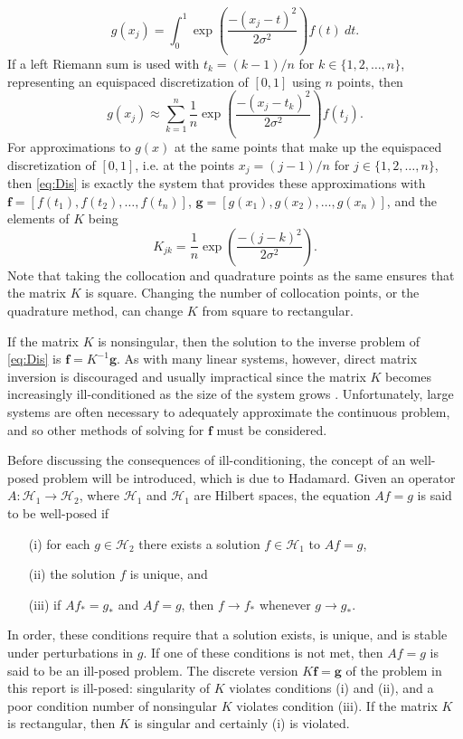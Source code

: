 \documentclass[12pt,notitlepage]{report}
\newcommand{\gVec}{\mathbf{g}}	%
\newcommand{\kMat}{K}	%
\newcommand{\fVec}{\mathbf{f}}	%
\newcommand{\noiseSD}{\sigma}	%
\begin{document}
\[g(x_j) = \int_0^1 \exp\left(\frac{-(x_j - t)^2}{2\noiseSD^2}\right)f(t) \: dt.\]
If a left Riemann sum is used with $t_k = (k-1)/n$ for $k \in \{1,2,\ldots,n\}$, representing an equispaced discretization of $[0,1]$ using $n$ points, then
\[g(x_j) \approx \sum_{k=1}^n \frac{1}{n}\exp\left(\frac{-(x_j - t_k)^2}{2\noiseSD^2}\right)f(t_j).\]
For approximations to $g(x)$ at the same points that make up the equispaced discretization of $[0,1]$, i.e. at the points $x_j = (j-1)/n$ for $j \in \{1,2,\ldots,n\}$, then \eqref{eq:Dis} is exactly the system that provides these approximations with $\fVec = [f(t_1),f(t_2),\ldots,f(t_n)]$, $\gVec = [g(x_1),g(x_2),\ldots,g(x_n)]$, and the elements of $\kMat$ being
\[K_{jk} = \frac{1}{n}\exp\left(\frac{-(j - k)^2}{2\noiseSD^2}\right).\]
Note that taking the collocation and quadrature points as the same ensures that the matrix $\kMat$ is square. Changing the number of collocation points, or the quadrature method, can change $\kMat$ from square to rectangular. \par
If the matrix $\kMat$ is nonsingular, then the solution to the inverse problem of \eqref{eq:Dis} is $\fVec = \kMat^{-1}\gVec$. As with many linear systems, however, direct matrix inversion is discouraged and usually impractical since the matrix $\kMat$ becomes increasingly ill-conditioned as the size of the system grows \cite{Vogel:2002}. Unfortunately, large systems are often necessary to adequately approximate the continuous problem, and so other methods of solving for $\fVec$ must be considered. \par
Before discussing the consequences of ill-conditioning, the concept of an well-posed problem will be introduced, which is due to Hadamard. Given an operator $A : \mathcal{H}_1 \rightarrow \mathcal{H}_2$, where $\mathcal{H}_1$ and $\mathcal{H}_1$ are Hilbert spaces, the equation $Af = g$ is said to be well-posed if
\begin{enumerate}
\item[(i)] for each $g \in \mathcal{H}_2$ there exists a solution $f \in \mathcal{H}_1$ to $Af = g$,
\item[(ii)] the solution $f$ is unique, and
\item[(iii)] if $Af_* = g_*$ and $Af = g$, then $f \rightarrow f_*$ whenever $g \rightarrow g_*$.
\end{enumerate}
In order, these conditions require that a solution exists, is unique, and is stable under perturbations in $g$. If one of these conditions is not met, then $Af = g$ is said to be an ill-posed problem. The discrete version $\kMat\fVec = \gVec$ of the problem in this report is ill-posed: singularity of $\kMat$ violates conditions (i) and (ii), and a poor condition number of nonsingular $\kMat$ violates condition (iii). If the matrix $\kMat$ is rectangular, then $\kMat$ is singular and certainly (i) is violated.  \par 
\end{document}
